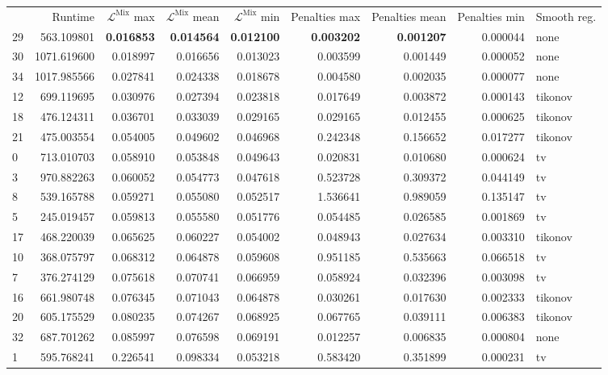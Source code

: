 \documentclass[nomenclature, english, bibtex]{kththesis}
\numberwithin{listing}{chapter}
\begin{document}
\begin{table}
\centering
\begin{tabular}{lrrrrrrrl}
 & Runtime & $\mathcal{L}^{\text{Mix}}$ max & $\mathcal{L}^{\text{Mix}}$ mean & $\mathcal{L}^{\text{Mix}}$ min & Penalties max & Penalties mean & Penalties min & Smooth reg. \\
 29 & 563.109801 & \bfseries 0.016853 & \bfseries 0.014564 & \bfseries 0.012100 & \bfseries 0.003202 & \bfseries 0.001207 & 0.000044 & none \\
 30 & 1071.619600 & 0.018997 & 0.016656 & 0.013023 & 0.003599 & 0.001449 & 0.000052 & none \\
 34 & 1017.985566 & 0.027841 & 0.024338 & 0.018678 & 0.004580 & 0.002035 & 0.000077 & none \\
 12 & 699.119695 & 0.030976 & 0.027394 & 0.023818 & 0.017649 & 0.003872 & 0.000143 & tikonov \\
 18 & 476.124311 & 0.036701 & 0.033039 & 0.029165 & 0.029165 & 0.012455 & 0.000625 & tikonov \\
 21 & 475.003554 & 0.054005 & 0.049602 & 0.046968 & 0.242348 & 0.156652 & 0.017277 & tikonov \\
 0 & 713.010703 & 0.058910 & 0.053848 & 0.049643 & 0.020831 & 0.010680 & 0.000624 & tv \\
 3 & 970.882263 & 0.060052 & 0.054773 & 0.047618 & 0.523728 & 0.309372 & 0.044149 & tv \\
 8 & 539.165788 & 0.059271 & 0.055080 & 0.052517 & 1.536641 & 0.989059 & 0.135147 & tv \\
 5 & 245.019457 & 0.059813 & 0.055580 & 0.051776 & 0.054485 & 0.026585 & 0.001869 & tv \\
 17 & 468.220039 & 0.065625 & 0.060227 & 0.054002 & 0.048943 & 0.027634 & 0.003310 & tikonov \\
 10 & 368.075797 & 0.068312 & 0.064878 & 0.059608 & 0.951185 & 0.535663 & 0.066518 & tv \\
 7 & 376.274129 & 0.075618 & 0.070741 & 0.066959 & 0.058924 & 0.032396 & 0.003098 & tv \\
 16 & 661.980748 & 0.076345 & 0.071043 & 0.064878 & 0.030261 & 0.017630 & 0.002333 & tikonov \\
 20 & 605.175529 & 0.080235 & 0.074267 & 0.068925 & 0.067765 & 0.039111 & 0.006383 & tikonov \\
 32 & 687.701262 & 0.085997 & 0.076598 & 0.069191 & 0.012257 & 0.006835 & 0.000804 & none \\
 1 & 595.768241 & 0.226541 & 0.098334 & 0.053218 & 0.583420 & 0.351899 & 0.000231 & tv \\

\end{tabular}
\end{table}
\end{document}
